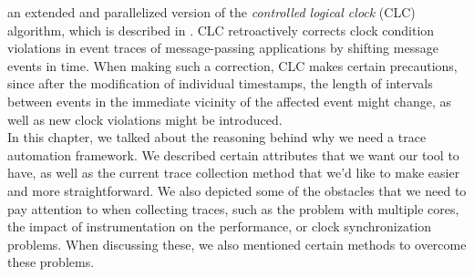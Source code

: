 an extended and parallelized version of the \emph{controlled logical
clock} (CLC) algorithm, which is described in \cite{brwl09}. CLC
retroactively corrects clock condition violations in event traces of
message-passing applications by shifting message events in time. When
making such a correction, CLC makes certain precautions, since
after the modification of individual timestamps, the length of
intervals between events in the immediate vicinity of the affected
event might change, as well as new clock violations might be
introduced.\\[0.5cm]
In this chapter, we talked about the reasoning behind why we need a
trace automation framework. We described certain attributes that we
want our tool to have, as well as the current trace collection method
that we'd like to make easier and more straightforward. We also
depicted some of the obstacles that we need to pay attention to when
collecting traces, such as the problem with multiple cores, the impact
of instrumentation on the performance, or clock synchronization
problems. When discussing these, we also mentioned certain methods to
overcome these problems.
